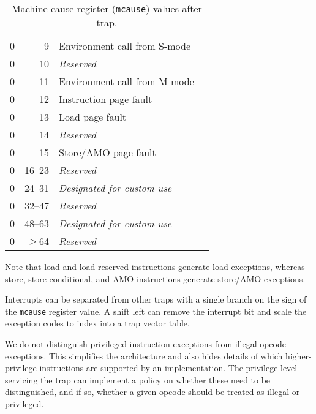 \begin{table*}[htbp]
\begin{center}
\begin{tabular}{|r|r|l|l|}
  0         & 9               & Environment call from S-mode \\
  0         & 10              & {\em Reserved} \\
  0         & 11              & Environment call from M-mode \\
  0         & 12              & Instruction page fault \\
  0         & 13              & Load page fault \\
  0         & 14              & {\em Reserved} \\
  0         & 15              & Store/AMO page fault \\
  0         & 16--23          & {\em Reserved} \\
  0         & 24--31          & {\em Designated for custom use} \\
  0         & 32--47          & {\em Reserved} \\
  0         & 48--63          & {\em Designated for custom use} \\
  0         & $\ge$64         & {\em Reserved} \\
  \hline

\end{tabular}
\end{center}
\caption{Machine cause register ({\tt mcause}) values after trap.}
\label{mcauses}
\end{table*}

Note that load and load-reserved instructions generate load exceptions,
whereas store, store-conditional, and AMO instructions generate store/AMO
exceptions.

\begin{commentary}
Interrupts can be separated from other traps with a single branch on the sign of
the {\tt mcause} register value.  A shift left can remove the
interrupt bit and scale the exception codes to index into a trap
vector table.
\end{commentary}

\begin{commentary}
We do not distinguish privileged instruction exceptions from illegal
opcode exceptions.  This simplifies the architecture and also hides
details of which higher-privilege instructions are supported by an
implementation.  The privilege level servicing the trap can implement
a policy on whether these need to be distinguished, and if so, whether
a given opcode should be treated as illegal or privileged.
\end{commentary}

